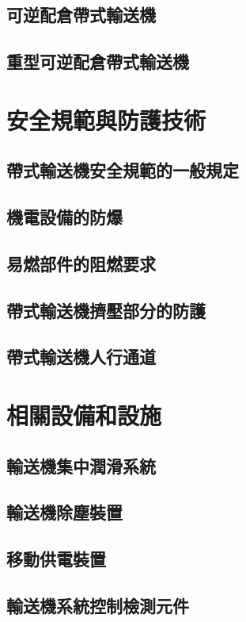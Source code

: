 \documentclass[UTF8]{ctexart}
\begin{document}
\subsection{可逆配倉帶式輸送機}
\subsection{重型可逆配倉帶式輸送機}
 



\newpage
\section{安全規範與防護技術}
\subsection{帶式輸送機安全規範的一般規定}
\subsection{機電設備的防爆}
\subsection{易燃部件的阻燃要求}
\subsection{帶式輸送機擠壓部分的防護}
\subsection{帶式輸送機人行通道}





\newpage
\section{相關設備和設施}
\subsection{輸送機集中潤滑系統}
\subsection{輸送機除塵裝置}
\subsection{移動供電裝置}
\subsection{輸送機系統控制檢測元件}
\end{document}
